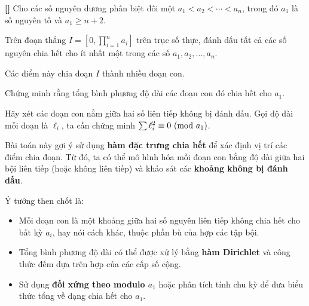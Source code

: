 \documentclass[../03-arithmetic-functions.tex]{subfiles}
\begin{document}
\begin{exercise*}\label{example:GBR-2015-TST-N3-P3}\textbf{[]}
    Cho các số nguyên dương phân biệt đôi một \( a_1 < a_2 < \cdots < a_n \), trong đó \( a_1 \) là số nguyên tố và \( a_1 \geq n + 2 \).

    Trên đoạn thẳng \( I = \left[0, \prod_{i=1}^n a_i \right] \) trên trục số thực,
    đánh dấu tất cả các số nguyên chia hết cho ít nhất một trong các số \( a_1, a_2, \ldots, a_n \).
    
    Các điểm này chia đoạn \( I \) thành nhiều đoạn con.
    
    Chứng minh rằng tổng bình phương độ dài các đoạn con đó chia hết cho \( a_1 \).
\end{exercise*}

\begin{remark*}
    Hãy xét các đoạn con nằm giữa hai số liên tiếp không bị đánh dấu. Gọi độ dài mỗi đoạn là \( \ell_i \), ta cần chứng minh \( \sum \ell_i^2 \equiv 0 \ (\mathrm{mod}\ a_1) \).
\end{remark*}

\begin{story*}
    Bài toán này gợi ý sử dụng \textbf{hàm đặc trưng chia hết} để xác định vị trí các điểm chia đoạn.
    Từ đó, ta có thể mô hình hóa mỗi đoạn con bằng độ dài giữa hai bội liên tiếp (hoặc không liên tiếp) và khảo sát các \textbf{khoảng không bị đánh dấu}.

    Ý tưởng then chốt là:
    \begin{itemize}[topsep=0pt, partopsep=0pt, itemsep=0pt]
        \item Mỗi đoạn con là một khoảng giữa hai số nguyên liên tiếp không chia hết cho bất kỳ \( a_i \), hay nói cách khác, thuộc phần bù của hợp các tập bội.
        \item Tổng bình phương độ dài có thể được xử lý bằng \textbf{hàm Dirichlet} và công thức đếm dựa trên hợp của các cấp số cộng.
        \item Sử dụng \textbf{đối xứng theo modulo \( a_1 \)} hoặc phân tích tính chu kỳ để đưa biểu thức tổng về dạng chia hết cho \( a_1 \).
    \end{itemize}
\end{story*}
\end{document}
